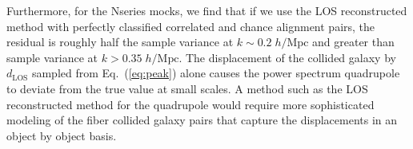                                                                                                                                                                                                                                                                          Furthermore, for the Nseries mocks, we find that if we use the LOS reconstructed method with 
                                                                                                                                                                                                                                                                         perfectly classified correlated and chance alignment pairs, the 
                                                                                                                                                                                                                                                                         residual is roughly half the sample variance at $k \sim 0.2\;h/\mathrm{Mpc}$
                                                                                                                                                                                                                                                                         and greater than sample variance at $k > 0.35\;h/\mathrm{Mpc}$.
                                                                                                                                                                                                                                                                         The displacement of the collided galaxy by $d_\mathrm{LOS}$ sampled from Eq.~(\ref{eq:peak}) 
                                                                                                                                                                                                                                                                         alone causes the power spectrum quadrupole to deviate from the true value
                                                                                                                                                                                                                                                                         at small scales. A method such as the LOS reconstructed method for the quadrupole 
                                                                                                                                                                                                                                                                         would require more sophisticated modeling of the fiber collided galaxy pairs that capture the displacements in an object by object basis. 

